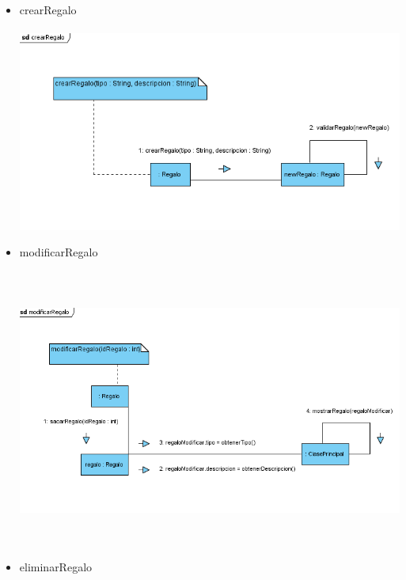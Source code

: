 


\begin{itemize}
	\item crearRegalo\\\\
		\includegraphics[width=16cm]{images/dc_crearRegalo.png}
	\item modificarRegalo\\\\
		\includegraphics[height=9cm]{images/dc_modificarRegalo.png}
	\item eliminarRegalo\\\\

\end{itemize}
